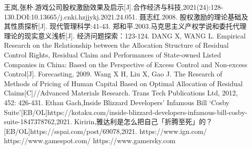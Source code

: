 \documentclass[hyperref]{ctexart}
\begin{document}
\begin{multicols}{2}
	\small
	\begin{thebibliography}{100}%
		王岚,张朴.游戏公司股权激励效果及启示[J].合作经济与科技,2021(24):128-130.DOI:10.13665/j.cnki.hzjjykj.2021.24.051.
		聂志红.2008. 股权激励的理论基础及其性质探析[J]. 现代管理科学:41-43.
		郑和平.2003.马克思主义产权学说和委托代理理论的现实意义浅析[J]. 经济问题探索：123-124.
		DANG X, WANG L. Empirical Research on the Relationship between the Allocation Structure of Residual Control Rights, Residual Claim and Performances of State-owned Listed Companies in China: Based on the Perspective of Excess Control and Non-excess Control[J]. Forecasting, 2009.
		Wang X H, Liu X, Gao J. The Research of Methods of Pricing of Human Capital Based on Optimal Allocation of Residual Claims[C]//Advanced Materials Research. Trans Tech Publications Ltd, 2012, 452: 426-431.
		Ethan Gach,Inside Blizzard Developers’ Infamous Bill ‘Cosby Suite’[EB/OL]https://kotaku.com/inside-blizzard-developers-infamous-bill-cosby-suite-1847378762,2021.
		Kiririn,雅达利是怎么把自己「折腾至死」的？[EB/OL]https://sspai.com/post/69078,2021.
		https://www.ign.com/
		https://www.gamespot.com/
		https://www.gamersky.com
	\end{thebibliography}
	\end{multicols}
	
\end{document}
